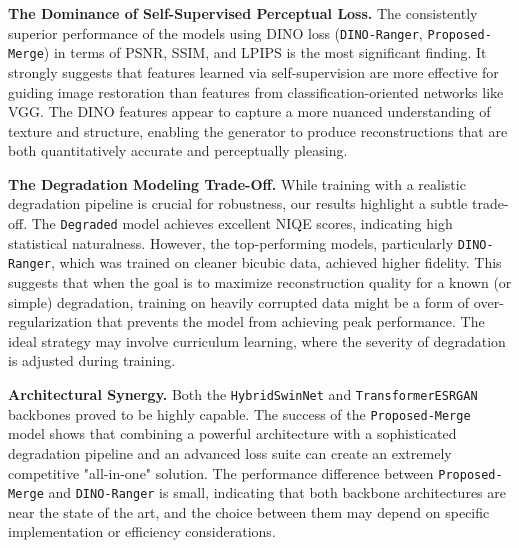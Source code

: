 \documentclass[10pt,twocolumn,letterpaper]{article}
\begin{document}
\textbf{The Dominance of Self-Supervised Perceptual Loss.} The consistently superior performance of the models using DINO loss (\texttt{DINO-Ranger}, \texttt{Proposed-Merge}) in terms of PSNR, SSIM, and LPIPS is the most significant finding. It strongly suggests that features learned via self-supervision are more effective for guiding image restoration than features from classification-oriented networks like VGG. The DINO features appear to capture a more nuanced understanding of texture and structure, enabling the generator to produce reconstructions that are both quantitatively accurate and perceptually pleasing.

\textbf{The Degradation Modeling Trade-Off.} While training with a realistic degradation pipeline is crucial for robustness, our results highlight a subtle trade-off. The \texttt{Degraded} model achieves excellent NIQE scores, indicating high statistical naturalness. However, the top-performing models, particularly \texttt{DINO-Ranger}, which was trained on cleaner bicubic data, achieved higher fidelity. This suggests that when the goal is to maximize reconstruction quality for a known (or simple) degradation, training on heavily corrupted data might be a form of over-regularization that prevents the model from achieving peak performance. The ideal strategy may involve curriculum learning, where the severity of degradation is adjusted during training.

\textbf{Architectural Synergy.} Both the \texttt{HybridSwinNet} and \texttt{TransformerESRGAN} backbones proved to be highly capable. The success of the \texttt{Proposed-Merge} model shows that combining a powerful architecture with a sophisticated degradation pipeline and an advanced loss suite can create an extremely competitive "all-in-one" solution. The performance difference between \texttt{Proposed-Merge} and \texttt{DINO-Ranger} is small, indicating that both backbone architectures are near the state of the art, and the choice between them may depend on specific implementation or efficiency considerations.

\end{document}
